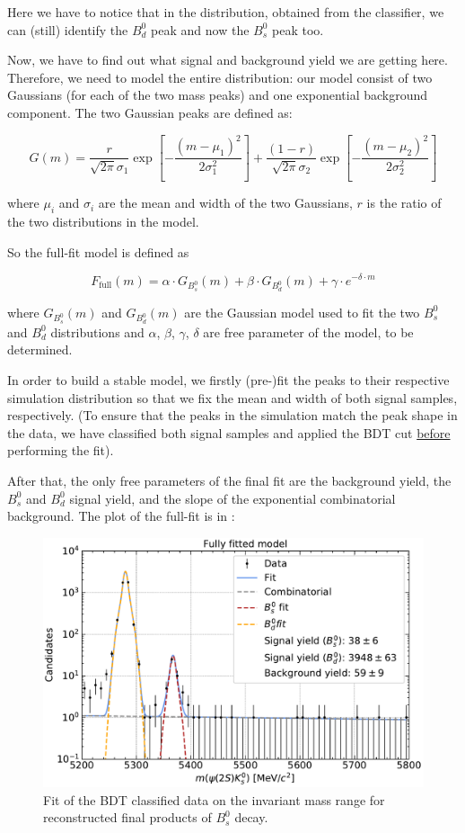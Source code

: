 Here we have to notice that in the distribution, obtained from the classifier, we can (still) identify the $B_d^0$ peak and now the $B_s^0$ peak too.

Now, we have to find out what signal and background yield we are getting here. Therefore, we need to model the entire distribution: our model consist of two Gaussians (for each of the two mass peaks) and one exponential background component.
The two Gaussian peaks are defined as:

\begin{equation}
    G(m) = \frac{r}{\sqrt{2 \pi} \sigma_1} \exp \left[-\frac{\left(m-\mu_1\right)^2}{2 \sigma_1^2}\right]+ \frac{(1-r)}{\sqrt{2 \pi} \sigma_2} \exp \left[-\frac{\left(m-\mu_2\right)^2}{2 \sigma_2^2}\right]
\end{equation}

where $\mu_i$ and $\sigma_i$ are the mean and width of the two Gaussians, $r$ is the ratio of the two distributions in the model.

So the full-fit model is defined as

\begin{equation}
    F_{\text{full}}(m) = \alpha \cdot G_{B_s^0}(m) + \beta \cdot G_{B_d^0}(m) + \gamma \cdot e^{- \delta \cdot m}
\end{equation}

where $G_{B_s^0}(m)$ and $G_{B_d^0}(m)$ are the Gaussian model used to fit the two $B_s^0$ and $B_d^0$ distributions and $\alpha$, $\beta$, $\gamma$, $\delta$ are free parameter of the model, to be determined.

In order to build a stable model, we firstly (pre-)fit the peaks to their respective simulation distribution so that we fix the mean and width of both signal samples, respectively. (To ensure that the peaks in the simulation match the peak shape in the data, we have classified both signal samples and applied the BDT cut \underline{before} performing the fit).

After that, the only free parameters of the final fit are the background yield, the $B_s^0$ and $B_d^0$ signal yield, and the slope of the exponential combinatorial background. The plot of the full-fit is in :

\newpage
\begin{figure}[H]
    \centering
    \includegraphics[width=0.70\linewidth]{graphs/plot_fit.pdf}
    \caption{Fit of the BDT classified data on the invariant mass range for reconstructed final products of $B_{s}^{0}$ decay.}
    \label{fit}
\end{figure}

